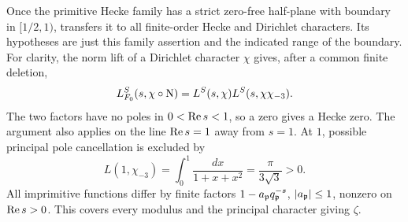 Once the primitive Hecke family has a strict zero-free half-plane with boundary in $[1/2,1)$,  transfers it to all finite-order Hecke and Dirichlet characters. Its hypotheses are just this family assertion and the indicated range of the boundary. For clarity, the norm lift of a Dirichlet character $\chi$ gives, after a common finite deletion,
\[
 L_{F_0}^S(s,\chi\circ\operatorname{N})=L^S(s,\chi)L^S(s,\chi\chi_{-3}).
\]
The two factors have no poles in $0<\operatorname{Re} s<1$, so a zero gives a Hecke zero. The argument also applies on the line $\operatorname{Re} s=1$ away from $s=1$. At $1$, possible principal pole cancellation is excluded by
\[
 L(1,\chi_{-3})=\int_0^1\frac{dx}{1+x+x^2}=\frac\pi{3\sqrt3}>0.
\]
All imprimitive functions differ by finite factors $1-a_\mathfrak p q_\mathfrak p^{-s}$, $|a_\mathfrak p|\le1$, nonzero on $\operatorname{Re} s>0$. This covers every modulus and the principal character giving $\zeta$.
